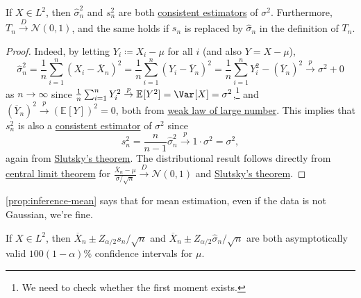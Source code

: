 \begin{proposition}\label{prop:inference-mean}
	If \(X \in L^2\), then \(\hat{\sigma} _n^2\) and \(s_n^2\) are both \hyperref[def:consistent]{consistent estimators} of \(\sigma ^2\). Furthermore, \(T_n \overset{D}{\to} \mathcal{N} (0, 1)\), and the same holds if \(s_n\) is replaced by \(\hat{\sigma} _n\) in the definition of \(T_n\).
\end{proposition}
\begin{proof}
	Indeed, by letting \(Y_i \coloneqq X_i - \mu \) for all \(i\) (and also \(Y = X - \mu \)),
	\[
		\hat{\sigma} _n^2
		= \frac{1}{n} \sum_{i=1}^{n} \left( X_i - \overline{X} _n\right) ^2
		= \frac{1}{n} \sum_{i=1}^{n} \left( Y_i - \overline{Y} _n\right) ^2
		= \frac{1}{n} \sum_{i=1}^{n} Y_i^2 - (\overline{Y} _n)^2
		\overset{p}{\to} \sigma ^2 + 0
	\]
	as \(n \to \infty \) since \(\frac{1}{n} \sum_{i=1}^{n} Y_i^2 \overset{p}{\to } \mathbb{E}_{}[Y^2] = \Var_{}[X] = \sigma ^2\),\footnote{We need to check whether the first moment exists.} and \((\overline{Y} _n)^2 \overset{p}{\to } (\mathbb{E}_{}[Y])^2 = 0\), both from \hyperref[thm:WLLN]{weak law of large number}. This implies that \(s_n^2\) is also a \hyperref[def:consistent]{consistent estimator} of \(\sigma ^2\) since
	\[
		s_n^2 = \frac{n}{n-1} \hat{\sigma} _n^2 \overset{p}{\to} 1 \cdot \sigma ^2 = \sigma ^2,
	\]
	again from \hyperref[col:Slutsky]{Slutsky's theorem}. The distributional result follows directly from \hyperref[thm:CLT]{central limit theorem} for \(\frac{\overline{X} _n - \mu }{\sigma / \sqrt{n} } \overset{D}{\to} \mathcal{N} (0, 1)\) and \hyperref[col:Slutsky]{Slutsky's theorem}.
\end{proof}

\autoref{prop:inference-mean} says that for mean estimation, even if the data is not Gaussian, we're fine.

\begin{corollary}\label{col:inference-mean-CI}
	If \(X \in L^2\), then \(\overline{X} _n \pm Z_{\alpha / 2} s_n / \sqrt{n} \) and \(\overline{X} _n \pm Z_{\alpha / 2} \hat{\sigma} _n / \sqrt{n} \) are both asymptotically valid \(100 (1 - \alpha )\%\) confidence intervals for \(\mu \).
\end{corollary}

